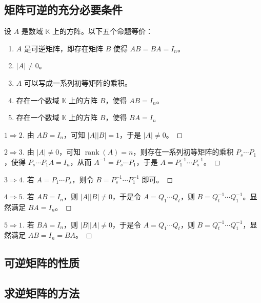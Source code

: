 \subsection{矩阵可逆的充分必要条件}

\begin{theorem}[矩阵可逆的充分必要条件]
	设 $A$ 是数域 $\mathbb K$ 上的方阵。以下五个命题等价：
	\begin{enumerate}
		\item $A$ 是可逆矩阵，即存在矩阵 $B$ 使得 $AB = BA = I_n$。
		\item $|A| \ne 0$。
		\item $A$ 可以写成一系列初等矩阵的乘积。
		\item 存在一个数域 $\mathbb K$ 上的方阵 $B$，使得 $AB = I_n$。
		\item 存在一个数域 $\mathbb K$ 上的方阵 $B$，使得 $BA = I_n$
	\end{enumerate}
\end{theorem}

\begin{proof}[$1 \Longrightarrow 2$]
	由 $AB = I_n$，可知 $|A| |B| = 1$，于是 $|A| \ne 0$。
\end{proof}

\begin{proof}[$2 \Longrightarrow 3$]
	由 $|A| \ne 0$，可知 $\operatorname{rank}(A) = n$，则存在一系列初等矩阵的乘积 $P_s \cdots P_1$，使得 $P_s \cdots P_1 A = I_n$，从而 $A^{-1} = P_s \cdots P_1$，于是 $A = P_1^{-1} \cdots P_s^{-1}$。
\end{proof}

\begin{proof}[$3 \Longrightarrow 4$]
	若 $A = P_1 \cdots P_s$，则令 $B = P_s^{-1} \cdots P_1^{-1}$ 即可。
\end{proof}

\begin{proof}[$4 \Longrightarrow 5$]
	若 $AB = I_n$，则 $|A||B| \ne 0$，于是令 $A = Q_1 \cdots Q_t$，则 $B = Q_t^{-1} \cdots Q_1^{-1}$。显然满足 $BA = I_n$。
\end{proof}

\begin{proof}[$5 \Longrightarrow 1$]
	若 $BA = I_n$，则 $|B||A| \ne 0$，于是令 $A = Q_1 \cdots Q_t$，则 $B = Q_t^{-1} \cdots Q_1^{-1}$，显然满足 $AB = I_n = BA$。
\end{proof}

\subsection{可逆矩阵的性质}



\subsection{求逆矩阵的方法}


